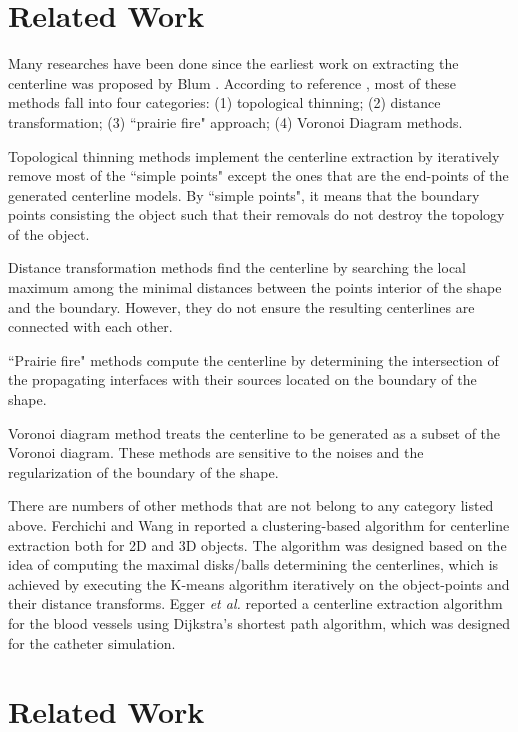 \section{Related Work}
\label{sec5_1}

Many researches have been done since the earliest work on extracting the centerline was proposed by Blum \cite{Blum1967}.
According to reference \cite{Ogniewicz1995}, most of these methods fall into four categories: (1) topological thinning; (2) distance transformation; (3) ``prairie fire" approach; (4) Voronoi Diagram methods. %

Topological thinning methods \cite{Ma2002,Sadleir2002} implement the centerline extraction by iteratively remove most of the ``simple points" except the ones that are the end-points of the generated centerline models. %
By ``simple points", it means that the boundary points consisting the object such that their removals do not destroy the topology of the object.

Distance transformation methods \cite{Niblack1992} find the centerline by searching the local maximum among the minimal distances between the points interior of the shape and the boundary. %
However, they do not ensure the resulting centerlines are connected with each other.

``Prairie fire" methods \cite{Blum1967,Leymarie1992} compute the centerline by determining the intersection of the propagating interfaces with their sources located on the boundary of the shape. %

Voronoi diagram method \cite{Sherbrooke1996,Antiga2003} treats the centerline to be generated as a subset of the Voronoi diagram.
These methods are sensitive to the noises and the regularization of the boundary of the shape.

There are numbers of other methods that are not belong to any category listed above.
Ferchichi and Wang in \cite{Ferchichi2006} reported a clustering-based algorithm for centerline extraction both for 2D and 3D objects.
The algorithm was designed based on the idea of computing the maximal disks/balls determining the centerlines, which is achieved by executing the K-means algorithm iteratively on the object-points and their distance transforms. %
Egger \textit{et al.} \cite{Egger2007} reported a centerline extraction algorithm for the blood vessels using Dijkstra's shortest path algorithm, which was designed for the catheter simulation. %
\section{Related Work}


